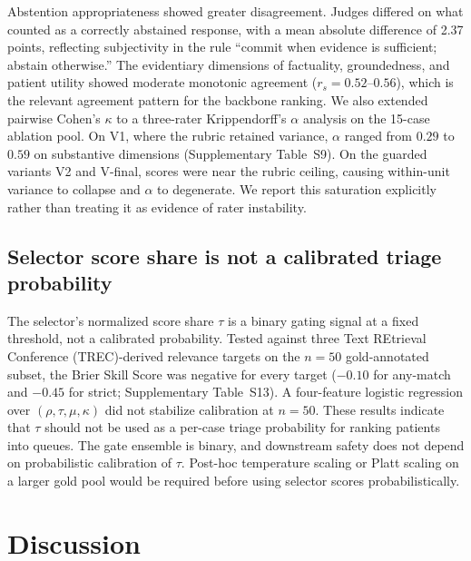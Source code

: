 \documentclass[pdflatex,Numbered]{sn-jnl}
\theoremstyle{plain}
\begin{document}
Abstention appropriateness showed greater disagreement. Judges differed on what counted as a correctly abstained response, with a mean absolute difference of 2.37 points, reflecting subjectivity in the rule ``commit when evidence is sufficient; abstain otherwise.'' The evidentiary dimensions of factuality, groundedness, and patient utility showed moderate monotonic agreement ($r_s = 0.52$--$0.56$), which is the relevant agreement pattern for the backbone ranking. We also extended pairwise Cohen's $\kappa$ to a three-rater Krippendorff's $\alpha$ analysis on the 15-case ablation pool. On V1, where the rubric retained variance, $\alpha$ ranged from $0.29$ to $0.59$ on substantive dimensions (Supplementary Table~S9). On the guarded variants V2 and V-final, scores were near the rubric ceiling, causing within-unit variance to collapse and $\alpha$ to degenerate. We report this saturation explicitly rather than treating it as evidence of rater instability.

\subsection{Selector score share is not a calibrated triage probability}
\label{sec:results_calib_brief}

The selector's normalized score share $\tau$ is a binary gating signal at a fixed threshold, not a calibrated probability. Tested against three Text REtrieval Conference (TREC)-derived relevance targets on the $n=50$ gold-annotated subset, the Brier Skill Score \citep{brier1950verification} was negative for every target ($-0.10$ for any-match and $-0.45$ for strict; Supplementary Table~S13). A four-feature logistic regression over $(\rho, \tau, \mu, \kappa)$ did not stabilize calibration at $n=50$. These results indicate that $\tau$ should not be used as a per-case triage probability for ranking patients into queues. The gate ensemble is binary, and downstream safety does not depend on probabilistic calibration of $\tau$. Post-hoc temperature scaling \citep{guo2017calibration} or Platt scaling \citep{platt1999probabilistic} on a larger gold pool would be required before using selector scores probabilistically.



\section{Discussion}
\label{sec:discussion}
\end{document}
